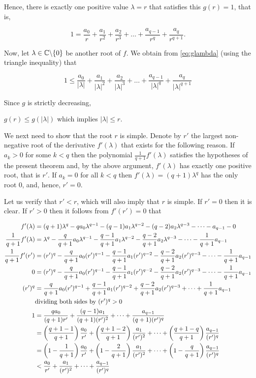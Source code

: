 \begin{theorem}
\begin{pf}
\begin{enumerate}[(a)]
Hence, there is exactly one positive value $\lambda = r$ that satisfies this $g(r) = 1$, that is,

$$1 =\frac{a_0}{r} + \frac{a_1}{r^2} + \frac{a_2}{r^3}+\dots + \frac{a_{q-1}}{r^q} +\frac{a_q}{r^{q+1}}.$$

Now, let $\lambda\in \mathbb C \backslash \{0\}$ be another root of $f$. We obtain from \eqref{eq:glambda} (using the triangle inequality) that

$$1\leq \frac{a_0}{|\lambda|} + \frac{a_1}{|\lambda|^2} + \frac{a_2}{|\lambda|^3}+\dots + \frac{a_{q-1}}{|\lambda|^q} +\frac{a_q}{|\lambda|^{q+1}}$$

Since $g$ is strictly decreasing,

$g(r)\leq g(|\lambda|)$ which implies $|\lambda|\leq r$.

We next need to show that the root $r$ is simple. Denote by $r'$ the largest non-negative root of the
derivative $f'(\lambda)$ that exists for the following reason. If $a_k > 0$ for some $k < q$ then the
polynomial $\frac{1}{q+1} f'(\lambda)$ satisfies the hypotheses of the present theorem and, by the above
argument, $f'(\lambda)$ has exactly one positive root, that is $r'$. If $a_k = 0$ for all $k < q$ then
$f'(\lambda) = (q + 1) \lambda^q$ has the only root $0$, and, hence, $r' = 0$. 

Let us verify that $r' < r$, which will also imply that $r$ is simple. If $r' = 0$ then it is clear. If $r' > 0$ then it follows
from $f'(r') = 0$ that

$\begin{aligned}
f'(\lambda) &=(q+1)\lambda^q -qa_0\lambda^{q-1} -(q-1)a_1\lambda^{q-2} -(q-2)a_2\lambda^{q-3} -\cdots - a_{q-1}-0\\
\frac{1}{q+1}f'(\lambda) &=\lambda^q -\frac{q}{q+1}a_0\lambda^{q-1} -\frac{q-1}{q+1}a_1\lambda^{q-2} -\frac{q-2}{q+1}a_2\lambda^{q-3} -\cdots - \frac{1}{q+1}a_{q-1}\\
\frac{1}{q+1}f'(r') &=(r')^q -\frac{q}{q+1}a_0(r')^{q-1} -\frac{q-1}{q+1}a_1(r')^{q-2} -\frac{q-2}{q+1}a_2(r')^{q-3} -\cdots - \frac{1}{q+1}a_{q-1}\\
0 &=(r')^q -\frac{q}{q+1}a_0(r')^{q-1} -\frac{q-1}{q+1}a_1(r')^{q-2} -\frac{q-2}{q+1}a_2(r')^{q-3} -\cdots - \frac{1}{q+1}a_{q-1}\\
(r')^q &=\frac{q}{q+1}a_0(r')^{q-1} +\frac{q-1}{q+1}a_1(r')^{q-2} +\frac{q-2}{q+1}a_2(r')^{q-3} +\cdots + \frac{1}{q+1}a_{q-1}\\
& \text{dividing both sides by } (r')^q>0 \\
1 &= \frac{qa_0}{(q+1)r'} +\frac{(q-1)a_1}{(q+1)(r')^2} +\dots+\frac{a_{q-1}}{(q+1)(r')^q} \\
  &= \left(\frac{q+1-1}{q+1}\right)\frac{a_0}{r'} +
     \left(\frac{q+1-2}{q+1}\right)\frac{a_1}{(r')^2} +\dots+
     \left(\frac{q+1-q}{q+1}\right)\frac{a_{q-1}}{(r')^q}\\
  &= \left(1-\frac{1}{q+1}\right)\frac{a_0}{r'} +
     \left(1-\frac{2}{q+1}\right)\frac{a_1}{(r')^2} +\dots+
     \left(1-\frac{q}{q+1}\right)\frac{a_{q-1}}{(r')^q}\\
  &< \frac{a_0}{r'} +\frac{a_1}{(r')^2} +\dots+\frac{a_{q-1}}{(r')^q}
\end{aligned}$


\end{enumerate}
\end{pf}
\end{theorem}
